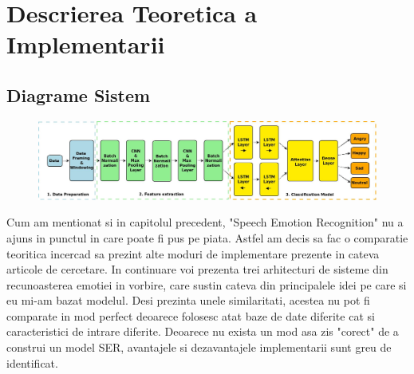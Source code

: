 \documentclass[a4paper,12pt, twoside]{book}
\begin{document}
			\chapter{Descrierea Teoretica a Implementarii}
				\section{Diagrame Sistem}
				\begin{figure}[h]
					\noindent
					\hspace*{-1cm}
					\includegraphics[scale=0.275]{Sistem_Diagram}
				\end{figure}
			Cum am mentionat si in capitolul precedent, "Speech Emotion Recognition" nu a ajuns in punctul in care poate fi pus pe piata. Astfel am decis sa fac o comparatie teoritica incercad sa prezint alte moduri de implementare prezente in cateva articole de cercetare. In continuare voi prezenta trei arhitecturi de sisteme din recunoasterea emotiei in vorbire, care sustin cateva din principalele idei pe care si eu mi-am bazat modelul. Desi prezinta unele similaritati, acestea nu pot fi comparate in mod perfect deoarece folosesc atat baze de date diferite cat si caracteristici de intrare diferite. Deoarece nu exista un mod asa zis "corect" de a construi un model SER, avantajele si dezavantajele implementarii sunt greu de identificat. \par	
\end{document}
